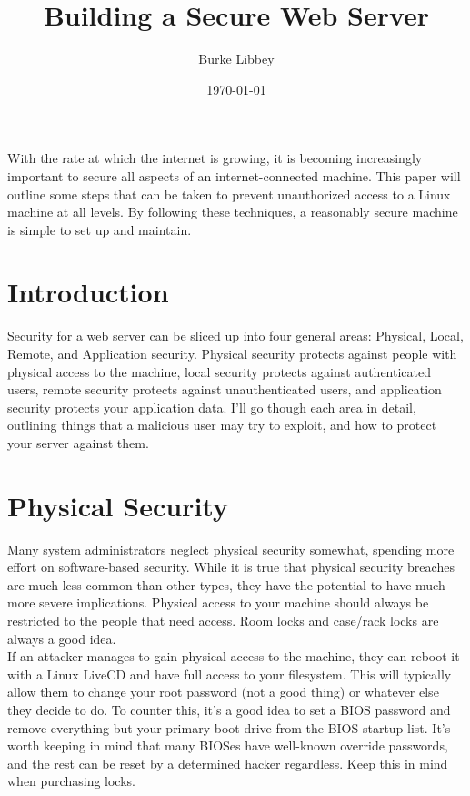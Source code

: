 \documentclass[10pt,letterpaper,titlepage]{article}
\begin{document}
\author{Burke Libbey}
\date{\today}
\title{Building a Secure Web Server}
\maketitle

\abstract 

\noindent With the rate at which the internet is growing, it is becoming increasingly important to secure all aspects of an internet-connected machine. This paper will outline some steps that can be taken to prevent unauthorized access to a Linux machine at all levels. By following these techniques, a reasonably secure machine is simple to set up and maintain.

\newpage 

\section*{Introduction}
Security for a web server can be sliced up into four general areas: Physical, Local, Remote, and Application security. Physical security protects against people with physical access to the machine,  local security protects against authenticated users, remote security protects against unauthenticated users, and application security protects your application data. I'll go though each area in detail, outlining things that a malicious user may try to exploit, and how to protect your server against them.

\section*{Physical Security}
\noindent Many system administrators neglect physical security somewhat, spending more effort on software-based security. While it is true that physical security breaches are much less common than other types, they have the potential to have much more severe implications. Physical access to your machine should always be restricted to the people that need access. Room locks and case/rack locks are always a good idea.
\\

\noindent If an attacker manages to gain physical access to the machine, they can reboot it with a Linux LiveCD and have full access to your filesystem. This will typically allow them to change your root password (not a good thing) or whatever else they decide to do. To counter this, it's a good idea to set a BIOS password and remove everything but your primary boot drive from the BIOS startup list. It's worth keeping in mind that many BIOSes have well-known override passwords, and the rest can be reset by a determined hacker regardless.\cite{bios} Keep this in mind when purchasing locks.
\end{document}
